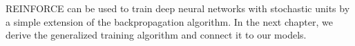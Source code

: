 \documentclass[12pt]{report}
\begin{document}
REINFORCE can be used to train deep neural networks with stochastic units by a simple extension of the backpropagation algorithm. In the next chapter,  we derive the generalized training algorithm and connect it to our models.

%
%



\end{document}
